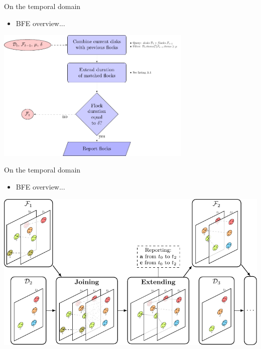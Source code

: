 \documentclass{beamer}
\begin{document}
    \begin{frame}{On the temporal domain}
        \begin{itemize} \item BFE overview... \end{itemize} \vspace{0.5cm}

        \centering
        \includegraphics[width=0.7\textwidth]{../thesis/pflocks_paper/figures/FF_flowchart}
    \end{frame}

    \begin{frame}{On the temporal domain}
        \begin{itemize} \item BFE overview... \end{itemize} \vspace{0.5cm}

        \centering
        \includegraphics[width=\textwidth]{../thesis/pflocks_paper/figures/Temporal/f_stages}
    \end{frame}
\end{document}
